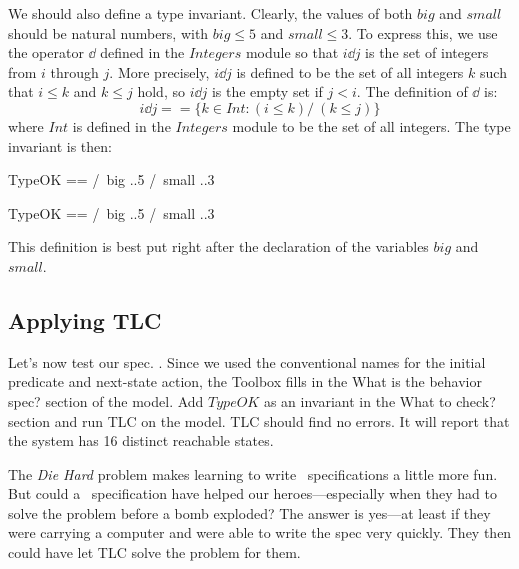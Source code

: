  \medskip
We should also define a type invariant.  Clearly, the values of
both $big$ and $small$ should be natural numbers, with $big\leq 5$
and $small\leq3$.  To express this, we use the operator 
$\dd$ defined in the $Integers$ module so that $i\dd j$ is the set of
integers from $i$ through $j$.  More precisely, $i\dd j$ is defined to
be the set of all integers $k$ such that $i\leq k$ and $k\leq j$ hold,
so $i\dd j$ is the empty set if $j<i$.  The definition of $\dd$ is:%
 \[ i \dd j == \{k \in Int : (i \leq k) /\ (k \leq j)\}
 \]
where 
$Int$ is defined in the $Integers$ module to be the set of all
integers.   The type invariant is then:
 \medskip
\begin{twocols}
\begin{notla}
TypeOK == /\ big   ..5
          /\ small ..3 
\end{notla}
\begin{tlatex}
%
%
\end{tlatex}
\midcol
\begin{verbatim*}
TypeOK == /\ big   ..5
          /\ small ..3 
\end{verbatim*}
\end{twocols}
 \medskip
This definition is best put right after the declaration of the
variables $big$ and $small$.

\subsection{Applying TLC}


Let's now test our spec.  .  Since we used the conventional names for the initial
predicate and next-state action, the Toolbox fills in the
\textsf{What is the behavior spec?} section of the model.  Add 
$TypeOK$ as an invariant in the \textsf{What to check?} section
and run TLC on the model.  TLC should find no errors.  It will 
report that the system has 16 distinct reachable states.

The \emph{Die Hard} problem makes learning to write \tlaplus\
specifications a little more fun.  But could a \tlaplus\ specification
have helped our heroes---especially when they had to solve the problem
before a bomb exploded?  The answer is yes---at least if they were
carrying a computer and were able to write the spec very quickly.
They then could have let TLC solve the problem for them.

